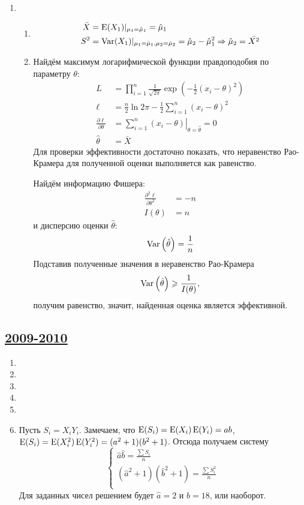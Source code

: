 \begin{enumerate}
\item
\begin{enumerate}
\item
\begin{align*}
\bar X &= \operatorname{E}(X_1) |_{\mu_1 = \hat{\mu}_1} = \hat{\mu}_1 \\
S^2 &= \operatorname{Var}(X_1) |_{\mu_1 = \hat{\mu}_1, \mu_2= \hat{\mu}_2} = \hat{\mu}_2 - \hat{\mu}_1^2 \Rightarrow \hat{\mu}_2 = \bar{X^2}
\end{align*}
\item Найдём максимум логарифмической функции правдоподобия по параметру $\theta$:
\begin{align*}
L &= \prod_{i=1}^n \frac{1}{\sqrt{2\pi}} \exp \left(-\frac{1}{2} (x_i - \theta)^2\right) \\
\ell &= \frac{n}{2} \ln 2\pi - \frac{1}{2} \sum_{i=1}^n (x_i - \theta)^2 \\
\frac{\partial \ell}{\partial \theta} &= \left. \sum_{i=1}^n (x_i - \theta) \right|_{\theta = \hat \theta} = 0 \\
\hat \theta &= \bar X
\end{align*}
Для проверки эффективности достаточно показать, что неравенство Рао-Крамера
для полученной оценки выполняется как равенство.

Найдём информацию Фишера:
\begin{align*}
\frac{\partial^2 \ell}{\partial \theta^2} &= -n \\
I(\theta) &= n
\end{align*}
и дисперсию оценки $\hat \theta$:
\[
\operatorname{Var}\left(\hat \theta \right) = \frac{1}{n}
\]
Подставив полученные значения в неравенство Рао-Крамера
\[
\operatorname{Var}\left(\hat \theta \right) \geqslant \frac{1}{I(\theta)},
\]
получим равенство, значит, найденная оценка является эффективной.
\end{enumerate}
\end{enumerate}

\subsection[2009-2010]{\hyperref[sec:kr_03_2009_2010]{2009-2010}}
\label{sec:sol_kr_03_2009_2010}


\begin{enumerate}
  \item 
  \item 
  \item 
  \item 
  \item 
  \item Пусть $S_i = X_i Y_i$. Замечаем, что $\operatorname{E}(S_i)=\operatorname{E}(X_i)\operatorname{E}(Y_i)=ab$, $\operatorname{E}(S_i)=\operatorname{E}(X_i^2)\operatorname{E}(Y_i^2)=(a^2+1)(b^2+1)$. Отсюда получаем систему
  \[
  \begin{cases}
  \hat a \hat b = \frac{\sum S_i}{n} \\
  (\hat a^2 + 1) (\hat b^2 + 1) = \frac{\sum S_i^2}{n} \\
  \end{cases}
  \]
  Для заданных чисел решением будет $\hat a = 2$ и $\hat b = 18$, или наоборот.
\end{enumerate}


